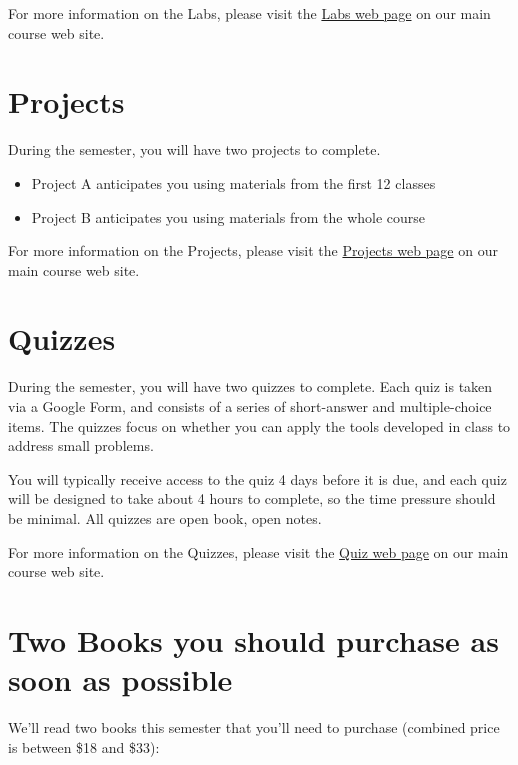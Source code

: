 \documentclass[
]{book}
\providecommand{\tightlist}{%
  \setlength{\itemsep}{0pt}\setlength{\parskip}{0pt}}
\begin{document}
For more information on the Labs, please visit the \href{https://github.com/THOMASELOVE/431-2020/tree/master/labs}{Labs web page} on our main course web site.

\hypertarget{projects}{%
\chapter{Projects}\label{projects}}

During the semester, you will have two projects to complete.

\begin{itemize}
\tightlist
\item
  Project A anticipates you using materials from the first 12 classes
\item
  Project B anticipates you using materials from the whole course
\end{itemize}

For more information on the Projects, please visit the \href{https://github.com/THOMASELOVE/431-2020/tree/master/projects}{Projects web page} on our main course web site.

\hypertarget{quizzes}{%
\chapter{Quizzes}\label{quizzes}}

During the semester, you will have two quizzes to complete. Each quiz is taken via a Google Form, and consists of a series of short-answer and multiple-choice items. The quizzes focus on whether you can apply the tools developed in class to address small problems.

You will typically receive access to the quiz 4 days before it is due, and each quiz will be designed to take about 4 hours to complete, so the time pressure should be minimal. All quizzes are open book, open notes.

For more information on the Quizzes, please visit the \href{https://github.com/THOMASELOVE/431-2020/tree/master/quizzes}{Quiz web page} on our main course web site.

\hypertarget{two-books-you-should-purchase-as-soon-as-possible}{%
\chapter{Two Books you should purchase as soon as possible}\label{two-books-you-should-purchase-as-soon-as-possible}}

We'll read two books this semester that you'll need to purchase (combined price is between \$18 and \$33):
\end{document}
